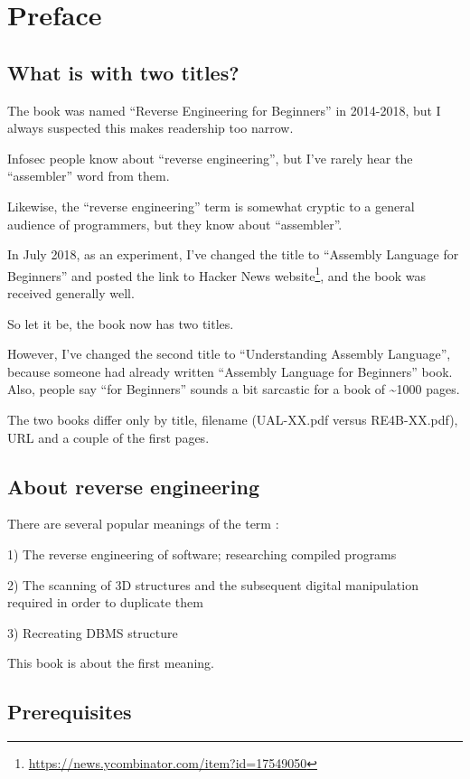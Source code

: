 \section*{Preface}

\subsection*{What is with two titles?}
\label{TwoTitles}

The book was named ``Reverse Engineering for Beginners'' in 2014-2018, but I always suspected this makes readership too narrow.

Infosec people know about ``reverse engineering'', but I've rarely hear the ``assembler'' word from them.

Likewise, the ``reverse engineering'' term is somewhat cryptic to a general audience of programmers, but they know about ``assembler''.

In July 2018, as an experiment, I've changed the title to ``Assembly Language for Beginners''
and posted the link to Hacker News website\footnote{\url{https://news.ycombinator.com/item?id=17549050}}, and the book was received generally well.

So let it be, the book now has two titles.

However, I've changed the second title to ``Understanding Assembly Language'',
because someone had already written ``Assembly Language for Beginners'' book.
Also, people say ``for Beginners'' sounds a bit sarcastic for a book of \textasciitilde{}1000 pages.

The two books differ only by title, filename (UAL-XX.pdf versus RE4B-XX.pdf),
URL and a couple of the first pages.

\subsection*{About reverse engineering}

There are several popular meanings of the term :

1) The reverse engineering of software; researching compiled programs

2) The scanning of 3D structures and the subsequent digital manipulation required in order to duplicate them

3) Recreating \ac{DBMS} structure

This book is about the first meaning.

\subsection*{Prerequisites}

